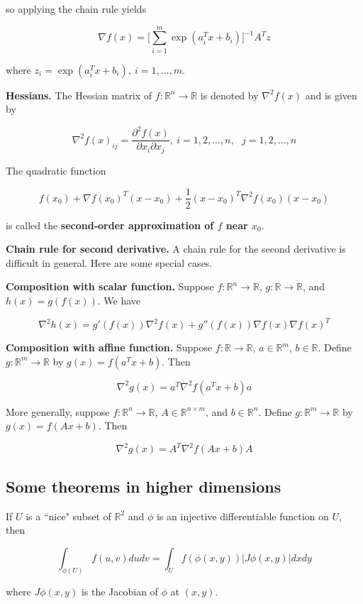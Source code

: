 so applying the chain rule yields

\[
\nabla f(x) =  \bigg[ \sum_{i=1}^m \exp( a_i^T x + b_i) \bigg]^{-1} A^T z
\]

where \(z_i = \exp(a_i^T x + b_i), \ i =1 , \ldots, m\).

\textbf{Hessians.} The Hessian matrix of \(f: \mathbb{R}^n \to \mathbb{R}\) is denoted by \(\nabla^2f(x)\) and is given by

\[
\nabla^2 f(x)_{ij} = \frac{\partial^2 f(x)}{\partial x_i \partial x_j} , \ i = 1, 2, \ldots, n, \ \ \ j = 1, 2, \ldots, n
\]

The quadratic function

\[
f(x_0) + \nabla f(x_0)^T (x - x_0) + \frac{1}{2} (x - x_0)^T \nabla^2 f(x_0) (x - x_0)
\]

is called the \textbf{second-order approximation of \(f\) near \(x_0\)}.

\textbf{Chain rule for second derivative.} A chain rule for the second derivative is difficult in general. Here are some special cases.

\textbf{Composition with scalar function.} Suppose \(f: \mathbb{R}^n \to \mathbb{R}\), \(g: \mathbb{R} \to \mathbb{R}\), and \(h(x) = g(f(x))\). We have

\[
\nabla^2 h(x) = g'(f(x)) \nabla^2 f(x) + g''(f(x)) \nabla f(x) \nabla f(x)^T
\]

\textbf{Composition with affine function.} Suppose  \(f: \mathbb{R} \to \mathbb{R}\), \(a \in \mathbb{R}^m\), \(b \in \mathbb{R}\). Define \(g: \mathbb{R}^m \to \mathbb{R}\) by \(g(x) = f(a^Tx + b)\). Then

\[
\nabla^2 g(x) = a^T \nabla^2 f(a^Tx + b) a
\]


More generally, suppose  \(f: \mathbb{R}^n \to \mathbb{R}\), \(A \in \mathbb{R}^{n \times m}\), and \(b \in \mathbb{R}^n\). Define \(g: \mathbb{R}^m \to \mathbb{R}\) by \(g(x) = f(Ax + b)\). Then

\[
\nabla^2 g(x) = A^T \nabla^2 f(Ax + b) A
\]

\subsection{Some theorems in higher dimensions}

\begin{proposition}If \(U\) is a ``nice" subset of \(\mathbb{R}^2\) and \(\phi\) is an injective differentiable function on \(U\), then 

\[
 \int_{\phi(U)} f(u,v) dudv = \int_U f(\phi(x,y)) | J \phi(x,y) | dx dy
\]

where \( J \phi(x,y)\) is the Jacobian of \(\phi\) at \((x,y)\).

\end{proposition}

